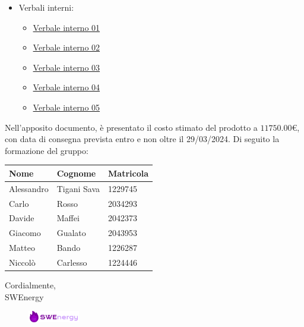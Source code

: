 \begin{itemize}
	\item Verbali interni:
		\begin{itemize}
			\item
				\href{https://github.com/Project-SWEnergy/documentazione/blob/main/Candidatura/Verbali/Interni/Verbale%20interno%20-%2001.pdf}{Verbale interno 01}
			\item
				\href{https://github.com/Project-SWEnergy/documentazione/blob/main/Candidatura/Verbali/Interni/Verbale%20interno%20-%2002.pdf}{Verbale interno 02}
			\item
				\href{https://github.com/Project-SWEnergy/documentazione/blob/main/Candidatura/Verbali/Interni/Verbale%20interno%20-%2003.pdf}{Verbale interno 03}
			\item
				\href{https://github.com/Project-SWEnergy/documentazione/blob/main/Candidatura/Verbali/Interni/Verbale%20interno%20-%2004.pdf}{Verbale interno 04}
			\item
				\href{https://github.com/Project-SWEnergy/documentazione/blob/main/Candidatura/Verbali/Interni/Verbale%20interno%20-%2005.pdf}{Verbale interno 05}
		\end{itemize}
\end{itemize}


\noindent
Nell'apposito documento, è presentato il costo stimato del prodotto a 
$11750.00$\euro, 
con data di consegna prevista entro e non oltre il 29/03/2024. Di seguito la
formazione del gruppo:
\begin{center}
{
\renewcommand{\arraystretch}{1.5}
\begin{tabular}{lll}
	\textbf{Nome} & \textbf{Cognome}	& \textbf{Matricola}		\\
	\hline
	Alessandro	&	Tigani Sava		 	&	1229745					\\
	Carlo		&	Rosso			 	&	2034293					\\
	Davide		&	Maffei			 	& 	2042373					\\
	Giacomo 	&	Gualato			 	& 	2043953					\\
	Matteo		&	Bando				&	1226287					\\
	Niccolò 	&	Carlesso		 	& 	1224446					\\
	\hline
\end{tabular}
}
\end{center}

\vspace{1cm}

\noindent
Cordialmente, \\
SWEnergy

\begin{figure}[H]
	\includegraphics[width=0.2\textwidth]{img/sign.png}
\end{figure}

